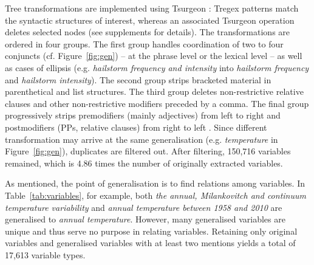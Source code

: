 \documentclass[11pt]{article}
\begin{document}
Tree transformations are implemented using Tsurgeon \cite{Levy2006}: Tregex patterns match the syntactic structures of interest, whereas an associated Tsurgeon operation deletes selected  nodes (see supplements for details).
The transformations are ordered in four groups.
The first group handles coordination of two to four conjuncts (cf. Figure~\ref{fig:gen}) -- at the phrase level or the lexical level -- as well as cases of ellipsis (e.g.  \emph{hailstorm frequency and intensity} into \emph{hailstorm frequency} and \emph{hailstorm intensity}).
The second group strips bracketed material in parenthetical and list structures.
The  third group  deletes non-restrictive relative clauses and other non-restrictive modifiers preceded by a comma.
The final group progressively strips premodifiers (mainly adjectives) from left to right and postmodifiers (PPs, relative clauses) from right to left .
Since different transformation may arrive at the same generalisation  (e.g. \emph{temperature} in Figure~\ref{fig:gen}), duplicates are filtered out.
After filtering, 150,716 variables remained, which is 4.86 times the number of originally extracted variables.

As mentioned, the point of generalisation is to find relations among variables.
In Table~\ref{tab:variables}, for example,  both \emph{the annual, Milankovitch and continuum temperature variability } and \emph{annual temperature between 1958 and 2010} are generalised to \emph{annual temperature}.
However, many generalised variables are unique and thus serve no purpose in relating variables.
Retaining only original variables and generalised variables with at least two mentions yields a total of 17,613 variable types. %
\end{document}
